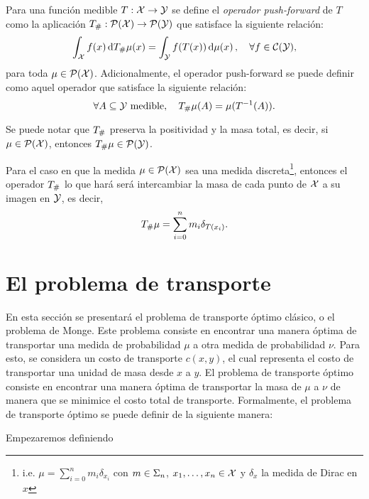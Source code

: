 {  \begin{definition}
      Para una función medible $T:\cX \to \cY$ se define el \emph{operador push-forward} de $T$ como la aplicación $\Tpf:\ProbSpace[\cX] \to \ProbSpace[\cY]$ que satisface la siguiente relación:
      \begin{equation}
          \label{eq:pushForward}
          \int_{\cX} f(x) \dd{\Tpf\mu(x)} = \int_{\cY} f(T(x)) \dmu[x], \quad \forall f \in \mathcal{C}(\cY),
      \end{equation}
      para toda $\mu \in \ProbSpace[\cX]$. Adicionalmente, el operador push-forward se puede definir como aquel operador que satisface la siguiente relación:
      \begin{equation}
          \label{eq:pushForward2}
          \forall A \subseteq \cY \text{ medible}, \quad \Tpf\mu(A) = \mu(T^{-1}(A)).
      \end{equation}
  \end{definition}

  \begin{remark}
      Se puede notar que $\Tpf$ preserva la positividad y la masa total, es decir, si $\mu \in \ProbSpace[\cX]$, entonces $\Tpf\mu \in \ProbSpace[\cY]$.
  \end{remark}

  \begin{remark}
      Para el caso en que la medida $\mu \in \ProbSpace$ sea una medida discreta\footnote{i.e. $\mu = \sum_{i=0}^{n} m_i \delta_{x_i}$ con $m\in\Simplex$, $x_1,\ldots, x_n\in\cX$ y $\delta_x$ la medida de Dirac en $x$}, entonces el operador $\Tpf$ lo que hará será intercambiar la masa de cada punto de $\cX$ a su imagen en $\cY$, es decir,
      \begin{equation}
          \label{eq:pushForwardDiscreto}
          \Tpf\mu = \sum_{i=0}^{n} m_i \delta_{T(x_i)}.
      \end{equation}

  \end{remark}



 }

\section{El problema de transporte}
 {
  En esta sección se presentará el problema de transporte óptimo clásico, o el problema de Monge. Este problema consiste en encontrar una manera óptima de transportar una medida de probabilidad $\mu$ a otra medida de probabilidad $\nu$. Para esto, se considera un costo de transporte $c(x, y)$, el cual representa el costo de transportar una unidad de masa desde $x$ a $y$. El problema de transporte óptimo consiste en encontrar una manera óptima de transportar la masa de $\mu$ a $\nu$ de manera que se minimice el costo total de transporte. Formalmente, el problema de transporte óptimo se puede definir de la siguiente manera:

  Empezaremos definiendo
 }